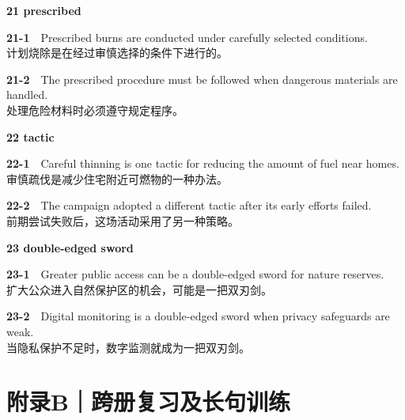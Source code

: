 \documentclass[a4paper,11pt,openany]{report}
\newcommand{\zhline}[1]{{\CJKsf\color{bodygrey}#1}}
\begin{document}
\textbf{21 prescribed}

\begin{samepage}
\textbf{21-1}　Prescribed burns are conducted under carefully selected conditions.\\
\zhline{计划烧除是在经过审慎选择的条件下进行的。}
\par\end{samepage}

\begin{samepage}
\textbf{21-2}　The prescribed procedure must be followed when dangerous materials are handled.\\
\zhline{处理危险材料时必须遵守规定程序。}
\par\end{samepage}

\textbf{22 tactic}

\begin{samepage}
\textbf{22-1}　Careful thinning is one tactic for reducing the amount of fuel near homes.\\
\zhline{审慎疏伐是减少住宅附近可燃物的一种办法。}
\par\end{samepage}

\begin{samepage}
\textbf{22-2}　The campaign adopted a different tactic after its early efforts failed.\\
\zhline{前期尝试失败后，这场活动采用了另一种策略。}
\par\end{samepage}

\textbf{23 double-edged sword}

\begin{samepage}
\textbf{23-1}　Greater public access can be a double-edged sword for nature reserves.\\
\zhline{扩大公众进入自然保护区的机会，可能是一把双刃剑。}
\par\end{samepage}

\begin{samepage}
\textbf{23-2}　Digital monitoring is a double-edged sword when privacy safeguards are weak.\\
\zhline{当隐私保护不足时，数字监测就成为一把双刃剑。}
\par\end{samepage}

\section{附录B｜跨册复习及长句训练}\label{ux9644ux5f55bux8de8ux518cux590dux4e60ux53caux957fux53e5ux8badux7ec3}
\end{document}
